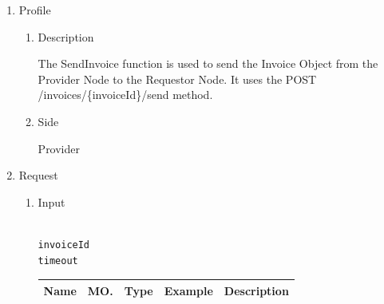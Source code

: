 \newpage



\begin{enumerate}

\item Profile

\begin{enumerate}

\item Description

The SendInvoice function is used to send the Invoice Object from the Provider Node to the Requestor Node. 
It uses the POST /invoices/\{invoiceId\}/send method.

\item Side

Provider

\end{enumerate}

\item Request

\begin{enumerate}

\item Input

\begin{tcolorbox}[boxrule=0pt, frame empty]
\begin{verbatim}

invoiceId
timeout

\end{verbatim}
\end{tcolorbox}





\begin{table}[H]
\footnotesize

\begin{center}
\begin{tabular}{|p{3cm}|l|p{3cm}|p{3cm}|p{4cm}|} 
\hline
\rowcolor{lightgray}	Name	& MO.	& Type	& Example & 	Description \\
\hline


\end{tabular}
\end{center}
\end{table}
\end{enumerate}
\end{enumerate}
